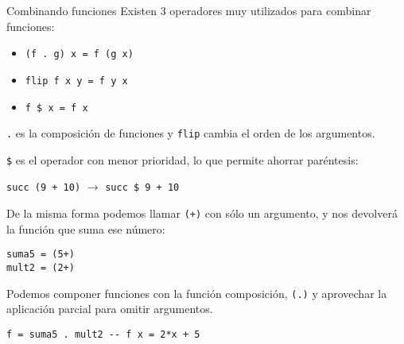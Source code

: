 \begin{extra}{Combinando funciones}
Existen 3 operadores muy utilizados para combinar funciones:

\espacio

\begin{itemize}
  \item \texttt{(f . g) x = f (g x)}
  \item \texttt{flip f x y = f y x}
  \item \texttt{f \$ x = f x}
\end{itemize}

\espacio

\texttt{.} es la composición de funciones y \texttt{flip} cambia el orden de
los argumentos.

\texttt{\$} es el operador con menor prioridad, lo que permite ahorrar paréntesis:

\espacio

\texttt{succ (9 + 10)} $\rightarrow$ \texttt{succ \$ 9 + 10}

\end{extra}
De la misma forma podemos llamar \texttt{(+)} con sólo un argumento, y nos
devolverá la función que suma ese número:

\begin{lstlisting}
suma5 = (5+)
mult2 = (2+)
\end{lstlisting}

Podemos componer funciones con la función composición, \texttt{(.)} y aprovechar
la aplicación parcial para omitir argumentos.

\begin{lstlisting}
f = suma5 . mult2 -- f x = 2*x + 5
\end{lstlisting}

\newpage
